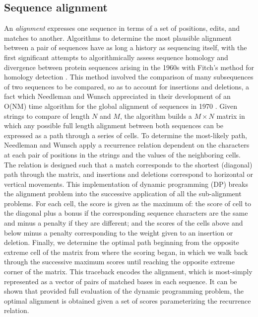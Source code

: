 \subsection{Sequence alignment}
\label{sec:sequence_alignment}

An \emph{alignment} expresses one sequence in terms of a set of positions, edits, and matches to another.
Algorithms to determine the most plausible alignment between a pair of sequences have as long a history as sequencing itself, with the first significant attempts to algorithmically assess sequence homology and divergence between protein sequences arising in the 1960s with Fitch's method for homology detection \cite{fitch1966improved}.
This method involved the comparison of many subsequences of two sequences to be compared, so as to account for insertions and deletions, a fact which Needleman and Wunsch appreciated in their development of an O(NM) time algorithm for the global alignment of sequences in 1970 \cite{needleman1970general}.
Given strings to compare of length $N$ and $M$, the algorithm builds a $M \times N$ matrix in which any possible full length alignment between both sequences can be expressed as a path through a series of cells.
To determine the most-likely path, Needleman and Wunsch apply a recurrence relation dependent on the characters at each pair of positions in the strings and the values of the neighboring cells.
The relation is designed such that a match corresponds to the shortest (diagonal) path through the matrix, and insertions and deletions correspond to horizontal or vertical movements.
This implementation of dynamic programming (DP) \cite{bellman1952theory} breaks the alignment problem into the successive application of all the sub-alignment problems.
For each cell, the score is given as the maximum of: the score of cell to the diagonal plus a bonus if the corresponding sequence characters are the same and minus a penalty if they are different; and the scores of the cells above and below minus a penalty corresponding to the weight given to an insertion or deletion.
Finally, we determine the optimal path beginning from the opposite extreme cell of the matrix from where the scoring began, in which we walk back through the successive maximum scores until reaching the opposite extreme corner of the matrix.
This traceback encodes the alignment, which is most-simply represented as a vector of pairs of matched bases in each sequence.
It can be shown that provided full evaluation of the dynamic programming problem, the optimal alignment is obtained given a set of scores parameterizing the recurrence relation.

